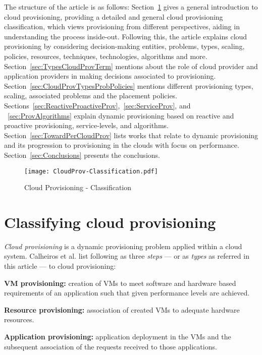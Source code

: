 \documentclass[10pt,journal,cspaper,compsoc]{IEEEtran}
\begin{document}
The structure of the article is as follows: Section~\ref{sec:classifyCloudProv} gives a general introduction to cloud provisioning, providing a detailed and general cloud provisioning classification, which views provisioning from different perspectives, aiding in understanding the process inside-out. Following this, the article explains cloud provisioning by considering decision-making entities, problems, types, scaling, policies, resources, techniques, technologies, algorithms and more. Section~\ref{sec:TypesCloudProvTerm} mentions about the role of cloud provider and application providers in making decisions associated to provisioning. Section~\ref{sec:CloudProvTypesProbPolicies} mentions different provisioning types, scaling, associated problems and the placement policies. Sections~\ref{sec:ReactiveProactiveProv},~\ref{sec:ServiceProv}, and ~\ref{sec:ProvAlgorithms} explain dynamic provisioning based on reactive and proactive provisioning, service-levels, and algorithms. Section~\ref{sec:TowardPerCloudProv} lists works that relate to dynamic provisioning and its progression to provisioning in the clouds with focus on performance. Section~\ref{sec:Conclusions} presents the conclusions.
\begin{figure*}[t]
\centering
\texttt{[image: CloudProv-Classification.pdf]}
\caption[Cloud Provisioning - Classification]{Cloud Provisioning - Classification}
\label{fig:CloudProvClassification}
\end{figure*}

\section{Classifying cloud provisioning}
\label{sec:classifyCloudProv}

\emph{Cloud provisioning} is a dynamic provisioning problem applied within a cloud system. Calheiros et al. \cite{calheirosvirtual3} list following as three \emph{steps} --- or as \emph{types} as referred in this article --- to cloud provisioning:
\begin{IEEEenumerate}
	\item \textbf{VM provisioning:} creation of VMs to meet software and hardware based requirements of an application such that given performance levels are achieved.
	\item \textbf{Resource provisioning:} association of created VMs to adequate hardware resources.	
	\item \textbf{Application provisioning:} application deployment in the VMs and the subsequent association of the requests received to those applications.
\end{IEEEenumerate}
\end{document}
